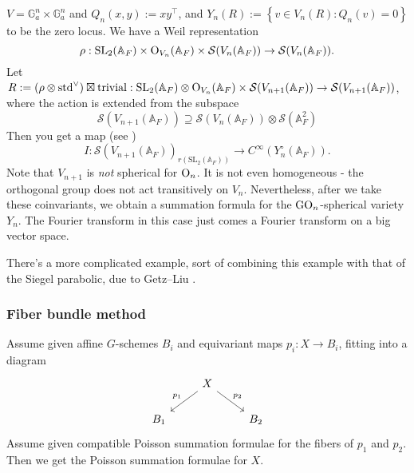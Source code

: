 \documentclass[reqno]{amsart} 
\numberwithin{theorem}{section}
\numberwithin{equation}{section}
\numberwithin{exercise}{section}
\begin{document}
\begin{example}\label{example:cq6ud5xqwu}
  $V = \mathbb{G}_a^n \times \mathbb{G}_a^n$ and $Q_n(x, y) := x y^{\intercal}$, and $Y_n(R) := \left\{ v \in V_n(R) : Q_n(v) = 0 \right\}$ to be the zero locus.  We have a Weil representation
  \begin{equation*}
    \rho : \mathrm{SL}_2(\mathbb{A}_F) \times \operatorname{O}_{V_n}(\mathbb{A}_F) \times \mathcal{S}(V_n(\mathbb{A}_F)) \rightarrow \mathcal{S}(V_n(\mathbb{A}_F)).
  \end{equation*}
  Let $R := (\rho \otimes\mathrm{std}^\vee) \boxtimes \mathrm{trivial} : \mathrm{SL}_2(\mathbb{A}_F) \otimes \operatorname{O}_{V_n}(\mathbb{A}_F) \times \mathcal{S}(V_{n + 1}(\mathbb{A}_F)) \rightarrow \mathcal{S}(V_{n + 1}(\mathbb{A}_F))$, where the action is extended from the subspace
  \begin{equation*}
    \mathcal{S}(V_{n + 1}(\mathbb{A}_F)) \supseteq \mathcal{S}(V_n(\mathbb{A}_F)) \otimes \mathcal{S}(\mathbb{A}_F^2)
  \end{equation*}
  Then you get a map (see \cite{MR4887846})
  \begin{equation*}
    I : \mathcal{S}(V_{n + 1}(\mathbb{A}_F))_{r(\mathrm{SL}_2(\mathbb{A}_F))} \rightarrow C^\infty(Y_n^{\circ}(\mathbb{A}_F)).
  \end{equation*}
  Note that $V_{n + 1}$ is \emph{not} spherical for $\operatorname{O}_n$.  It is not even homogeneous - the orthogonal group does not act transitively on $V_n$.  Nevertheless, after we take these coinvariants, we obtain a summation formula for the $\operatorname{GO}_n$-spherical variety $Y_n$.  The Fourier transform in this case just comes a Fourier transform on a big vector space.

  There's a more complicated example, sort of combining this example with that of the Siegel parabolic, due to Getz--Liu \cite{MR3916514}.
\end{example}

\subsubsection{Fiber bundle method}

Assume given affine $G$-schemes $B_i$ and equivariant maps $p_i : X \rightarrow B_i$, fitting into a diagram
\begin{equation*}
  \begin{tikzcd}
    & X \arrow[dl, "p_1"'] \arrow[dr, "p_2"] & \\
    B_1 & & B_2
  \end{tikzcd}
\end{equation*}
Assume given compatible Poisson summation formulae for the fibers of $p_1$ and $p_2$.  Then we get the Poisson summation formulae for $X$.
\end{document}

